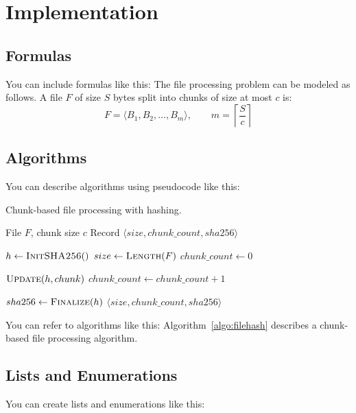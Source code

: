 \chapter{Implementation}
\label{chap:implementation}

\section{Formulas}

You can include formulas like this: The file processing problem can be modeled as follows. A file $F$ of size $S$ bytes split into chunks of size at most $c$ is:
\[ F = \langle B_1, B_2, \ldots, B_m \rangle, \qquad m = \left\lceil \frac{S}{c} \right\rceil \]

\section{Algorithms}

You can describe algorithms using pseudocode like this:

\begin{algorithm}[htbp]
    \caption{Chunk-based file processing with hashing.}
    \label{algo:filehash}
    \begin{algorithmic}[1]
        \Require File $F$, chunk size $c$
        \Ensure Record $\langle size, chunk\_count, sha256 \rangle$

        \State $h \gets \textsc{InitSHA256}()$ 
        \State $size \gets \textsc{Length}(F)$
        \State $chunk\_count \gets 0$
        \Statex

        \State $\textsc{Update}(h, chunk)$
        \State $chunk\_count \gets chunk\_count + 1$
        \EndFor
        \Statex

        \State $sha256 \gets \textsc{Finalize}(h)$
        \State \Return $\langle size, chunk\_count, sha256 \rangle$
    \end{algorithmic}
\end{algorithm}

You can refer to algorithms like this: Algorithm~\ref{algo:filehash} describes a chunk-based file processing algorithm.

\section{Lists and Enumerations}

You can create lists and enumerations like this:

